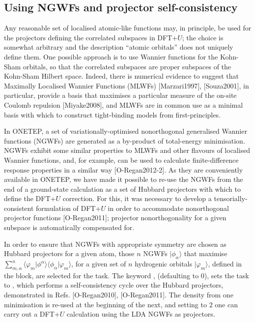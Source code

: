 \documentclass[letterpaper,10pt,english]{sphinxmanual}
\begin{document}
\subsection{Using NGWFs and projector self-consistency}
\label{\detokenize{ONETEP_DFT+U_README:using-ngwfs-and-projector-self-consistency}}
Any reasonable set of localised atomic-like functions may, in principle,
be used for the projectors defining the correlated subspaces in
DFT+\(U\); the choice is somewhat arbitrary and the description
“atomic orbitals” does not uniquely define them. One possible approach
is to use Wannier functions for the Kohn-Sham orbitals, so that the
correlated subspaces are proper subspaces of the Kohn-Sham Hilbert
space. Indeed, there is numerical evidence to suggest that Maximally
Localised Wannier Functions (MLWFs) {[}Marzari1997{]}, {[}Souza2001{]},
in particular, provide a basis that maximises a particular measure of
the on-site Coulomb repulsion {[}Miyake2008{]}, and MLWFs are
in common use as a minimal basis with which to construct tight-binding
models from first-principles.

In ONETEP, a set of variationally-optimised nonorthogonal generalised
Wannier functions (NGWFs) are generated as a by-product of total-energy
minimisation. NGWFs exhibit some similar properties to MLWFs and other
flavours of localised Wannier functions, and, for example, can be used
to calculate finite-difference response properties in a similar
way {[}O-Regan2012-2{]}. As they are conveniently available in
ONETEP, we have made it possible to re-use the NGWFs from the end of a
ground-state calculation as a set of Hubbard projectors with which to
define the DFT+\(U\) correction. For this, it was necessary to
develop a tensorially-consistent formulation of DFT+\(U\) in order
to accommodate nonorthogonal projector
functions {[}O-Regan2011{]}; projector nonorthogonality
for a given subspace is automatically compensated for.

In order to ensure that NGWFs with appropriate symmetry are chosen as
Hubbard projectors for a given atom, those \(n\) NGWFs
\(\lvert \phi_\alpha \rangle\) that maximise \(\sum^n_{m,\alpha }\langle \varphi_m  \rvert  \phi^\alpha \rangle \langle \phi_\alpha \rvert \varphi_m \rangle\), for a given set of
\(n\) hydrogenic orbitals \(\lvert \varphi_m \rangle\), defined
in the  block, are selected for the task. The keyword
, (defaulting to \(0\)), sets the task to
, which performs a self-consistency cycle over the Hubbard
projectors, demonstrated in
Refs. {[}O-Regan2010{]}, {[}O-Regan2011{]}. The density from one
minimisation is re-used at the beginning of the next, and setting
 to \(2\) one can carry out a DFT+\(U\)
calculation using the LDA NGWFs as projectors.
\end{document}
